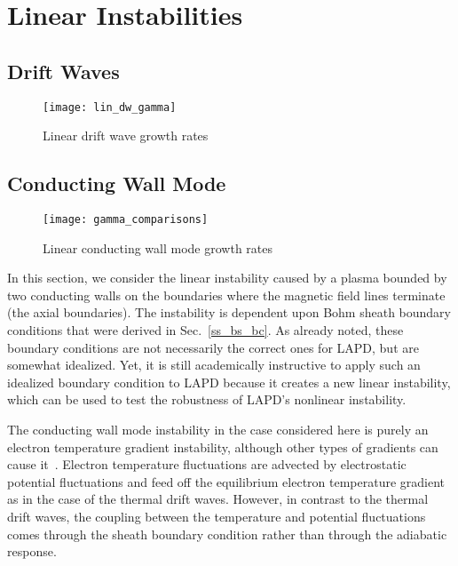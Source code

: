 \chapter{Linear Instabilities}
\label{c_lin_inst}

\section{Drift Waves}
\label{s_drift_waves}

\begin{figure}[!htbp]
\texttt{[image: lin\_dw\_gamma]}
\hfil
\caption{Linear drift wave growth rates}
\label{lin_dw_gamma}
\end{figure}

\section{Conducting Wall Mode}
\label{s_cwm}

\begin{figure}[!htbp]
\texttt{[image: gamma\_comparisons]}
\hfil
\caption{Linear conducting wall mode growth rates}
\label{gamma_comparisons}
\end{figure}


In this section, we consider the linear instability caused by a plasma bounded by two conducting walls on the boundaries where the magnetic field lines terminate (the axial boundaries).
The instability is dependent upon Bohm sheath boundary conditions that were derived in Sec.~\ref{ss_bs_bc}. As already noted, these boundary conditions are not necessarily the correct ones
for LAPD, but are somewhat idealized. Yet, it is still academically instructive to apply such an idealized boundary condition to LAPD because it creates a new linear instability, which
can be used to test the robustness of LAPD's nonlinear instability.


The conducting wall mode instability in the case considered here is purely an electron temperature gradient instability, although other types of gradients can cause it~\cite{berk1993}.
Electron temperature fluctuations are advected by electrostatic potential fluctuations and feed off the equilibrium electron temperature gradient as in the case of the thermal drift waves.
However, in contrast to the thermal drift waves, the coupling between the temperature and potential fluctuations comes through the sheath boundary condition rather than through the adiabatic
response.
